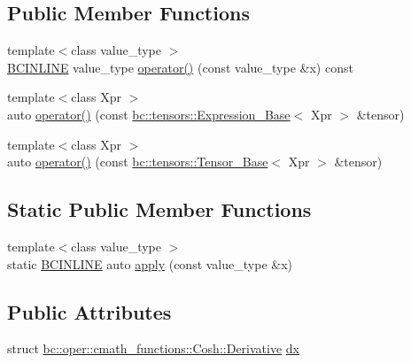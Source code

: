 \subsection*{Public Member Functions}
\begin{DoxyCompactItemize}
\item 
{\footnotesize template$<$class value\+\_\+type $>$ }\\\hyperlink{common_8h_a6699e8b0449da5c0fafb878e59c1d4b1}{B\+C\+I\+N\+L\+I\+NE} value\+\_\+type \hyperlink{structbc_1_1oper_1_1cmath__functions_1_1Cosh_a19d08ca6266658ed8d966d1821e2805a}{operator()} (const value\+\_\+type \&x) const
\item 
{\footnotesize template$<$class Xpr $>$ }\\auto \hyperlink{structbc_1_1oper_1_1cmath__functions_1_1Cosh_ad4b0090c0b5ca522f98d84bac682e9c1}{operator()} (const \hyperlink{classbc_1_1tensors_1_1Expression__Base}{bc\+::tensors\+::\+Expression\+\_\+\+Base}$<$ Xpr $>$ \&tensor)
\item 
{\footnotesize template$<$class Xpr $>$ }\\auto \hyperlink{structbc_1_1oper_1_1cmath__functions_1_1Cosh_a066aafb9f888c258f5354b2174d265e9}{operator()} (const \hyperlink{classbc_1_1tensors_1_1Tensor__Base}{bc\+::tensors\+::\+Tensor\+\_\+\+Base}$<$ Xpr $>$ \&tensor)
\end{DoxyCompactItemize}
\subsection*{Static Public Member Functions}
\begin{DoxyCompactItemize}
\item 
{\footnotesize template$<$class value\+\_\+type $>$ }\\static \hyperlink{common_8h_a6699e8b0449da5c0fafb878e59c1d4b1}{B\+C\+I\+N\+L\+I\+NE} auto \hyperlink{structbc_1_1oper_1_1cmath__functions_1_1Cosh_ae815ee9b5af8faa207069f3c8aeff772}{apply} (const value\+\_\+type \&x)
\end{DoxyCompactItemize}
\subsection*{Public Attributes}
\begin{DoxyCompactItemize}
\item 
struct \hyperlink{structbc_1_1oper_1_1cmath__functions_1_1Cosh_1_1Derivative}{bc\+::oper\+::cmath\+\_\+functions\+::\+Cosh\+::\+Derivative} \hyperlink{structbc_1_1oper_1_1cmath__functions_1_1Cosh_aaed626a7155e6df3c7ea226793f8b0e7}{dx}
\end{DoxyCompactItemize}


